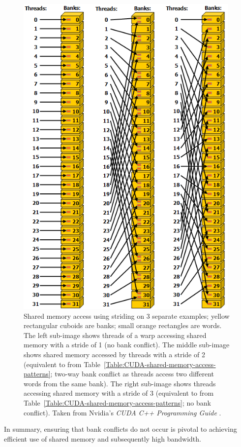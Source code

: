 \begin{figure}[h!]
	\centering
	\includegraphics[width=11cm, keepaspectratio]{images/ch1/CUDA_shared_memory_banks_words_conflicts.png}
	\caption{Shared memory access using striding on 3 separate examples; yellow rectangular cuboids are banks; small orange rectangles are words. The left sub-image shows threads of a warp accessing shared memory with a stride of 1 (no bank conflict). The middle sub-image shows shared memory accessed by threads with a stride of 2 (equivalent to  from Table~\ref{Table:CUDA-shared-memory-access-patterns}; two-way bank conflict as threads access two different words from the same bank). The right sub-image shows threads accessing shared memory with a stride of 3 (equivalent to  from Table~\ref{Table:CUDA-shared-memory-access-patterns}; no bank conflict). Taken from Nvidia's \emph{CUDA C++ Programming Guide} \cite{NVIDIAMay2022}.}
	\label{Figure:CUDA-shared-memory-banks-words-conflicts}
\end{figure}

In summary, ensuring that bank conflicts do not occur is pivotal to achieving efficient use of shared memory and subsequently high bandwidth.

